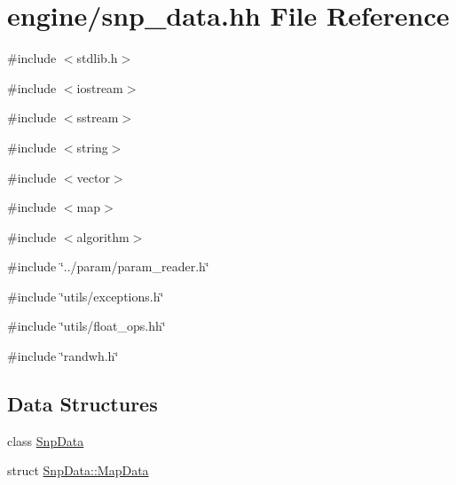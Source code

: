 \hypertarget{snp__data_8hh}{
\section{engine/snp\_\-data.hh File Reference}
\label{snp__data_8hh}
}
{\ttfamily \#include $<$stdlib.h$>$}\par
{\ttfamily \#include $<$iostream$>$}\par
{\ttfamily \#include $<$sstream$>$}\par
{\ttfamily \#include $<$string$>$}\par
{\ttfamily \#include $<$vector$>$}\par
{\ttfamily \#include $<$map$>$}\par
{\ttfamily \#include $<$algorithm$>$}\par
{\ttfamily \#include \char`\"{}../param/param\_\-reader.h\char`\"{}}\par
{\ttfamily \#include \char`\"{}utils/exceptions.h\char`\"{}}\par
{\ttfamily \#include \char`\"{}utils/float\_\-ops.hh\char`\"{}}\par
{\ttfamily \#include \char`\"{}randwh.h\char`\"{}}\par
\subsection*{Data Structures}
\begin{DoxyCompactItemize}
\item 
class \hyperlink{classSnpData}{SnpData}
\item 
struct \hyperlink{structSnpData_1_1MapData}{SnpData::MapData}
\end{DoxyCompactItemize}
